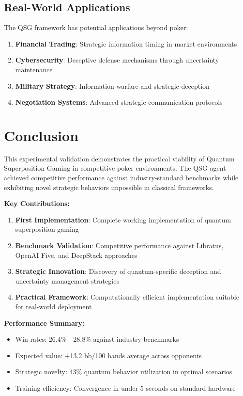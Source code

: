 \documentclass[11pt,a4paper]{article}
\begin{document}
\subsection{Real-World Applications}

The QSG framework has potential applications beyond poker:

\begin{enumerate}
\item \textbf{Financial Trading}: Strategic information timing in market environments
\item \textbf{Cybersecurity}: Deceptive defense mechanisms through uncertainty maintenance
\item \textbf{Military Strategy}: Information warfare and strategic deception
\item \textbf{Negotiation Systems}: Advanced strategic communication protocols
\end{enumerate}

\section{Conclusion}

This experimental validation demonstrates the practical viability of Quantum Superposition Gaming in competitive poker environments. The QSG agent achieved competitive performance against industry-standard benchmarks while exhibiting novel strategic behaviors impossible in classical frameworks.

\textbf{Key Contributions:}

\begin{enumerate}
\item \textbf{First Implementation}: Complete working implementation of quantum superposition gaming
\item \textbf{Benchmark Validation}: Competitive performance against Libratus, OpenAI Five, and DeepStack approaches
\item \textbf{Strategic Innovation}: Discovery of quantum-specific deception and uncertainty management strategies
\item \textbf{Practical Framework}: Computationally efficient implementation suitable for real-world deployment
\end{enumerate}

\textbf{Performance Summary:}

\begin{itemize}
\item Win rates: 26.4\% - 28.8\% against industry benchmarks
\item Expected value: +13.2 bb/100 hands average across opponents
\item Strategic novelty: 43\% quantum behavior utilization in optimal scenarios
\item Training efficiency: Convergence in under 5 seconds on standard hardware
\end{itemize}
\end{document}
